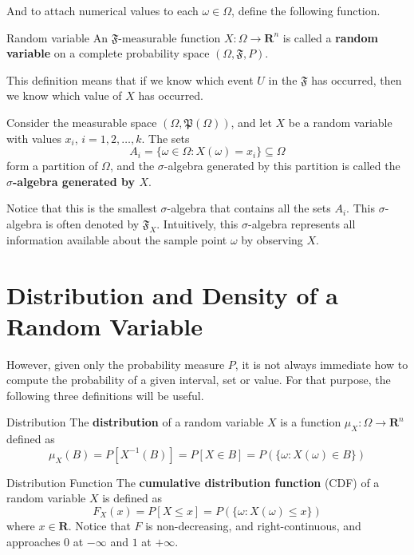 And to attach numerical values to each $\omega \in \Omega$, define the following function.


\begin{definition}[]{Random variable}{}
	An $\mathfrak{F}$-measurable function $X: \Omega \longrightarrow \textbf{R}^n$ is called a \textbf{random variable} on a complete probability space $(\Omega, \mathfrak{F}, P)$. 
\end{definition}

This definition means that if we know which event $U$ in the $\mathfrak{F}$ has occurred, then we know which value of $X$ has occurred. 

Consider the measurable space $(\Omega, \mathfrak{P}(\Omega))$, and let $X$ be a random variable with values $x_i$, $i = 1,2, \ldots, k$. The sets
\[
	A_i = \{ \omega \in \Omega : X(\omega) = x_i \} \subseteq \Omega
\]
form a partition of $\Omega$, and the $\sigma$-algebra generated by this partition is called the \textbf{$\sigma$-algebra generated by $X$}.

Notice that this is the smallest $\sigma$-algebra that contains all the sets $A_i$. This $\sigma$-algebra is often denoted by $\mathfrak{F}_X$. Intuitively, this $\sigma$-algebra represents all information available about the sample point $\omega$ by observing $X$. 


\section{Distribution and Density of a Random Variable}

However, given only the probability measure $P$, it is not always immediate how to compute the probability of a given interval, set or value. For that purpose, the following three definitions will be useful.

\begin{definition}[]{Distribution}{}
	The \textbf{distribution} of a random variable $X$ is a function $\mu_X : \Omega \longrightarrow \textbf{R}^n$ defined as
	\[
		\mu_X(B) = P [X^{-1}(B)] = P[X \in B] = P(\{ \omega : X(\omega) \in B \})
	\]
\end{definition}

\begin{definition}[]{Distribution Function}{}
	The \textbf{cumulative distribution function} (CDF) of a random variable $X$ is defined as
	\[
		F_X(x) = P [X \leq x] = P(\{ \omega : X(\omega) \leq x \})
	\]
	where $x \in \textbf{R}$. Notice that $F$ is non-decreasing, and right-continuous, and approaches $0$ at $- \infty$ and $1$ at $+\infty$.
\end{definition}

